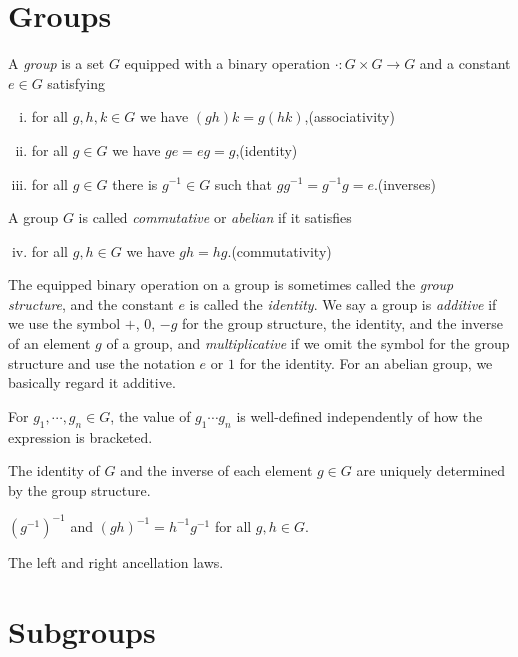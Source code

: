 \documentclass{../../large}
\begin{document}
\section{Groups}
\begin{prb}[Groups]
A \emph{group} is a set $G$ equipped with a binary operation $\cdot:G\times G\to G$ and a constant $e\in G$ satisfying
\begin{enumerate}[(i)]
\item for all $g,h,k\in G$ we have $(gh)k=g(hk)$,\hfill(associativity)
\item for all $g\in G$ we have $ge=eg=g$,\hfill(identity)
\item for all $g\in G$ there is $g^{-1}\in G$ such that $gg^{-1}=g^{-1}g=e$.\hfill(inverses)
\end{enumerate}
A group $G$ is called \emph{commutative} or \emph{abelian} if it satisfies
\begin{enumerate}[(i)]
\setcounter{enumi}{3}
\item for all $g,h\in G$ we have $gh=hg$.\hfill(commutativity)
\end{enumerate}
The equipped binary operation on a group is sometimes called the \emph{group structure}, and the constant $e$ is called the \emph{identity}.
We say a group is \emph{additive} if we use the symbol $+$, $0$, $-g$ for the group structure, the identity, and the inverse of an element $g$ of a group, and \emph{multiplicative} if we omit the symbol for the group structure and use the notation $e$ or $1$ for the identity.
For an abelian group, we basically regard it additive.
\begin{parts}
\item For $g_1,\cdots,g_n\in G$, the value of $g_1\cdots g_n$ is well-defined independently of how the expression is bracketed.
\item The identity of $G$ and the inverse of each element $g\in G$ are uniquely determined by the group structure.
\item $(g^{-1})^{-1}$ and $(gh)^{-1}=h^{-1}g^{-1}$ for all $g,h\in G$.
\item The left and right ancellation laws.
\end{parts}
\end{prb}


\begin{prb}
\end{prb}

\section{Subgroups}
\end{document}
